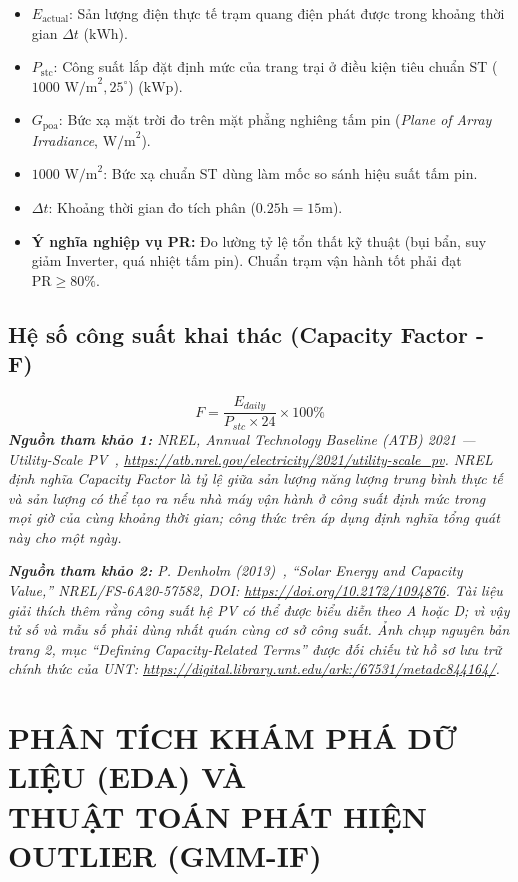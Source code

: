\documentclass[12pt,a4paper]{article}
\begin{document}
\begin{itemize}
    \item $E_{\text{actual}}$: Sản lượng điện thực tế trạm quang điện phát được trong khoảng thời gian $\Delta t$ ($\text{kWh}$).
    \item $P_{\text{stc}}$: Công suất lắp đặt định mức của trang trại ở điều kiện tiêu chuẩn ST ($1000 \text{ W/m}^2, 25^\circ\text{}$) ($\text{kWp}$).
    \item $G_{\text{poa}}$: Bức xạ mặt trời đo trên mặt phẳng nghiêng tấm pin (\textit{Plane of Array Irradiance}, $\text{W/m}^2$).
    \item $1000 \text{ W/m}^2$: Bức xạ chuẩn ST dùng làm mốc so sánh hiệu suất tấm pin.
    \item $\Delta t$: Khoảng thời gian đo tích phân ($0.25\text{h} = 15\text{m}$).
    \item \textbf{Ý nghĩa nghiệp vụ PR:} Đo lường tỷ lệ tổn thất kỹ thuật (bụi bẩn, suy giảm Inverter, quá nhiệt tấm pin). Chuẩn trạm vận hành tốt phải đạt $\text{PR} \ge 80\%$.
\end{itemize}

\subsection{Hệ số công suất khai thác (Capacity Factor - F)}
\begin{equation}
    F = \frac{E_{daily}}{P_{stc} \times 24} \times 100\%
\end{equation}
\textit{\textbf{Nguồn tham khảo 1:} NREL, \textit{Annual Technology Baseline (ATB) 2021 — Utility-Scale PV}~\cite{nrelatb2021pv}, \url{https://atb.nrel.gov/electricity/2021/utility-scale_pv}. NREL định nghĩa Capacity Factor là tỷ lệ giữa sản lượng năng lượng trung bình thực tế và sản lượng có thể tạo ra nếu nhà máy vận hành ở công suất định mức trong mọi giờ của cùng khoảng thời gian; công thức trên áp dụng định nghĩa tổng quát này cho một ngày.}

\textit{\textbf{Nguồn tham khảo 2:} P. Denholm (2013)~\cite{denholm2013capacity}, ``Solar Energy and Capacity Value,'' NREL/FS-6A20-57582, DOI: \url{https://doi.org/10.2172/1094876}. Tài liệu giải thích thêm rằng công suất hệ PV có thể được biểu diễn theo A hoặc D; vì vậy tử số và mẫu số phải dùng nhất quán cùng cơ sở công suất. Ảnh chụp nguyên bản trang 2, mục ``Defining Capacity-Related Terms'' được đối chiếu từ hồ sơ lưu trữ chính thức của UNT: \url{https://digital.library.unt.edu/ark:/67531/metadc844164/}.}


\section[KHÁM PHÁ DỮ LIỆU EDA \& OUTLIER GMM-IF]{PHÂN TÍCH KHÁM PHÁ DỮ LIỆU (EDA) VÀ\\THUẬT TOÁN PHÁT HIỆN OUTLIER (GMM-IF)}
\end{document}

